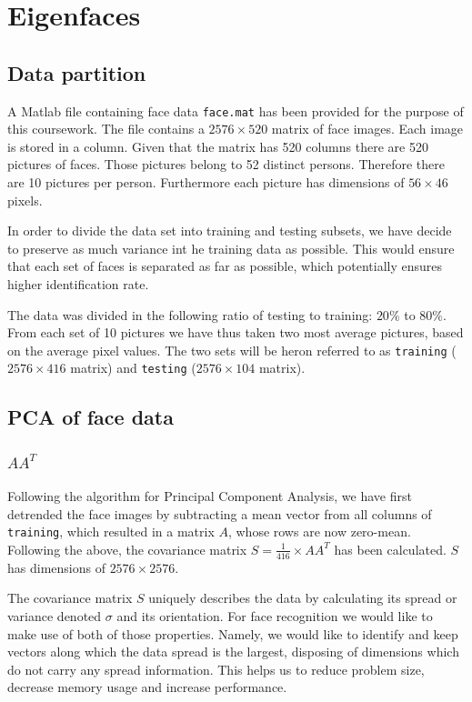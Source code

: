 \documentclass[10pt,twocolumn,letterpaper]{article}
\begin{document}
\section{Eigenfaces}

\subsection{Data partition}

A Matlab file containing face data {\tt\small face.mat} has been provided for the purpose of this coursework. The file contains a $2576 \times 520$ matrix of face images. Each image is stored in a column. Given that the matrix has 520 columns there are 520 pictures of faces. Those pictures belong to 52 distinct persons. Therefore there are 10 pictures per person. Furthermore each picture has dimensions of $56 \times 46$ pixels.

In order to divide the data set into training and testing subsets, we have decide to preserve as much variance int he training data as possible. This would ensure that each set of faces is separated as far as possible, which potentially ensures higher identification rate.

The data was divided in the following ratio of testing to training: $20\%$ to $80\%$. From each set of 10 pictures we have thus taken two most average pictures, based on the average pixel values. The two sets will be heron referred to as {\tt\small training} ($2576 \times 416$ matrix) and {\tt\small testing} ($2576 \times 104$ matrix).

\subsection{PCA of face data}
\subsubsection{\boldmath$AA^T$} \label{sec:aat}
Following the algorithm for Principal Component Analysis, we have first detrended the face images by subtracting a mean vector from all columns of {\tt\small training}, which resulted in a matrix $A$, whose rows are now zero-mean. Following the above, the covariance matrix $S=\frac{1}{416} \times AA^T$ has been calculated. $S$ has dimensions of $2576 \times 2576$.

The covariance matrix $S$ uniquely describes the data by calculating its spread or variance denoted $\sigma$ and its orientation. For face recognition we would like to make use of both of those properties. Namely, we would like to identify and keep vectors along which the data spread is the largest, disposing of dimensions which do not carry any spread information. This helps us to reduce problem size, decrease memory usage and increase performance. 
\end{document}
